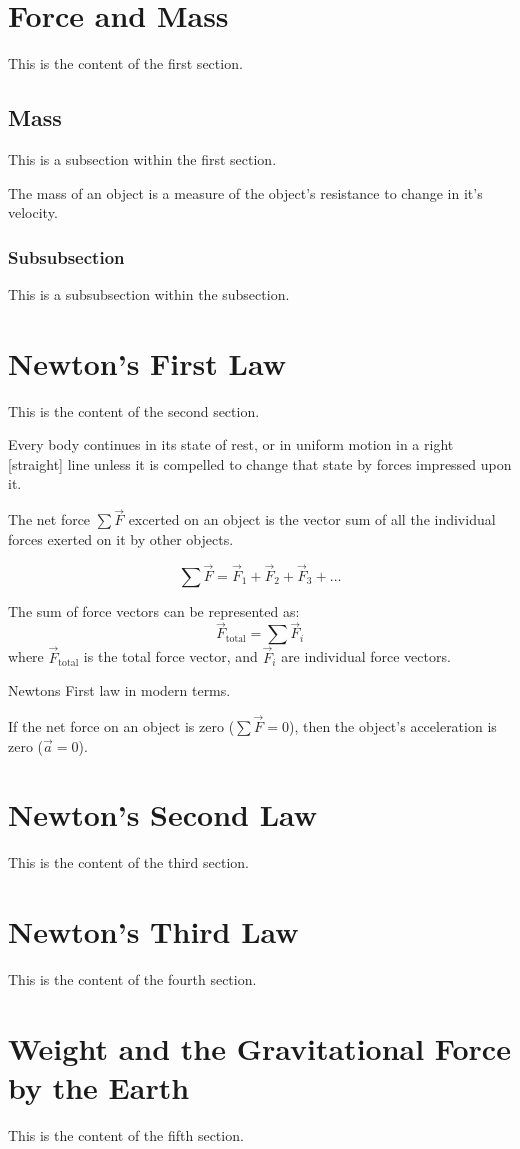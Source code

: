 
\section{Force and Mass}
This is the content of the first section.

\subsection{Mass}
This is a subsection within the first section.

\begin{definition}[mass]
    The mass of an object is a measure of the object's resistance to change in it's velocity.
\end{definition}

\subsubsection{Subsubsection}
This is a subsubsection within the subsection.

\section{Newton's First Law}
This is the content of the second section.

\begin{definition}[Law 1]
    Every body continues in its state of rest, or in uniform motion in a right [straight] line unless it is compelled to change that state by forces impressed upon it.
\end{definition}

The net force $\sum \vec{F}$ excerted on an object is the vector sum of all the individual forces exerted on it by other objects.

\begin{equation}
    \sum \vec{F} = \vec{F}_1 +\vec{F}_2 + \vec{F}_3 + \dots \label{eq:Net_Force}
\end{equation}


The sum of force vectors can be represented as:
\[
    \vec{F}_{\text{total}} = \sum \vec{F}_i
\]
where $\vec{F}_{\text{total}}$ is the total force vector, and $\vec{F}_i$ are individual force vectors.


Newtons First law in modern terms.

\begin{definition}
    If the net force on an object is zero ($\sum \vec{F} = 0$), then the object's acceleration is zero ($\vec{a} = 0$).
\end{definition}

\section{Newton's Second Law}
This is the content of the third section.

\section{Newton's Third Law}
This is the content of the fourth section.

\section{Weight and the Gravitational Force by the Earth}
This is the content of the fifth section.
